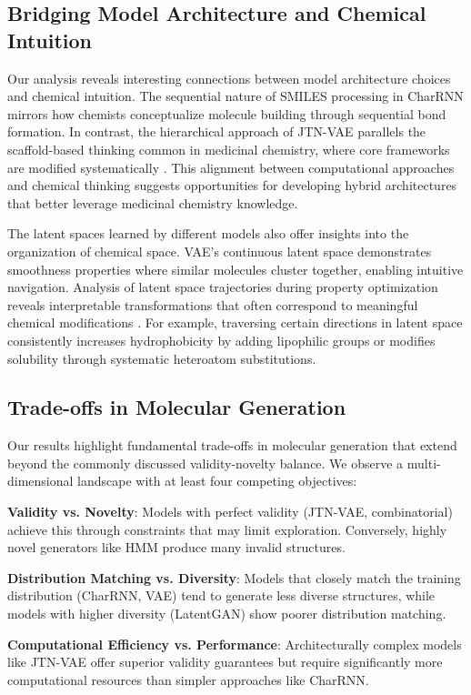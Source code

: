 \documentclass[conference]{IEEEtran}
\begin{document}
\subsection{Bridging Model Architecture and Chemical Intuition}
Our analysis reveals interesting connections between model architecture choices and chemical intuition. The sequential nature of SMILES processing in CharRNN mirrors how chemists conceptualize molecule building through sequential bond formation. In contrast, the hierarchical approach of JTN-VAE parallels the scaffold-based thinking common in medicinal chemistry, where core frameworks are modified systematically \cite{Maragakis2020}. This alignment between computational approaches and chemical thinking suggests opportunities for developing hybrid architectures that better leverage medicinal chemistry knowledge.

The latent spaces learned by different models also offer insights into the organization of chemical space. VAE's continuous latent space demonstrates smoothness properties where similar molecules cluster together, enabling intuitive navigation. Analysis of latent space trajectories during property optimization reveals interpretable transformations that often correspond to meaningful chemical modifications \cite{Winter2019, Yoshikawa2019}. For example, traversing certain directions in latent space consistently increases hydrophobicity by adding lipophilic groups or modifies solubility through systematic heteroatom substitutions.

\subsection{Trade-offs in Molecular Generation}
Our results highlight fundamental trade-offs in molecular generation that extend beyond the commonly discussed validity-novelty balance. We observe a multi-dimensional landscape with at least four competing objectives:

\textbf{Validity vs. Novelty}: Models with perfect validity (JTN-VAE, combinatorial) achieve this through constraints that may limit exploration. Conversely, highly novel generators like HMM produce many invalid structures.

\textbf{Distribution Matching vs. Diversity}: Models that closely match the training distribution (CharRNN, VAE) tend to generate less diverse structures, while models with higher diversity (LatentGAN) show poorer distribution matching.

\textbf{Computational Efficiency vs. Performance}: Architecturally complex models like JTN-VAE offer superior validity guarantees but require significantly more computational resources than simpler approaches like CharRNN.
\end{document}
